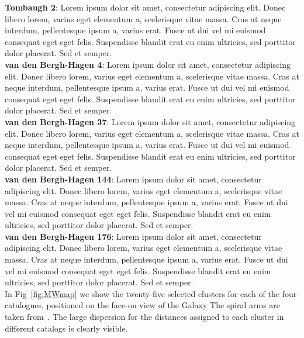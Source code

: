 \documentclass{aa}
\begin{document}
 \noindent\textbf{Tombaugh 2}: Lorem ipsum dolor sit amet, consectetur adipiscing elit. Donec libero lorem, varius eget elementum a, scelerisque vitae massa. Cras at neque interdum, pellentesque ipsum a, varius erat. Fusce ut dui vel mi euismod consequat eget eget felis. Suspendisse blandit erat eu enim ultricies, sed porttitor dolor placerat. Sed et semper.\\

 \noindent\textbf{van den Bergh-Hagen 4}: Lorem ipsum dolor sit amet, consectetur adipiscing elit. Donec libero lorem, varius eget elementum a, scelerisque vitae massa. Cras at neque interdum, pellentesque ipsum a, varius erat. Fusce ut dui vel mi euismod consequat eget eget felis. Suspendisse blandit erat eu enim ultricies, sed porttitor dolor placerat. Sed et semper.\\

 \noindent\textbf{van den Bergh-Hagen 37}: Lorem ipsum dolor sit amet, consectetur adipiscing elit. Donec libero lorem, varius eget elementum a, scelerisque vitae massa. Cras at neque interdum, pellentesque ipsum a, varius erat. Fusce ut dui vel mi euismod consequat eget eget felis. Suspendisse blandit erat eu enim ultricies, sed porttitor dolor placerat. Sed et semper.\\

 \noindent\textbf{van den Bergh-Hagen 144}: Lorem ipsum dolor sit amet, consectetur adipiscing elit. Donec libero lorem, varius eget elementum a, scelerisque vitae massa. Cras at neque interdum, pellentesque ipsum a, varius erat. Fusce ut dui vel mi euismod consequat eget eget felis. Suspendisse blandit erat eu enim ultricies, sed porttitor dolor placerat. Sed et semper.\\

 \noindent\textbf{van den Bergh-Hagen 176}: Lorem ipsum dolor sit amet, consectetur adipiscing elit. Donec libero lorem, varius eget elementum a, scelerisque vitae massa. Cras at neque interdum, pellentesque ipsum a, varius erat. Fusce ut dui vel mi euismod consequat eget eget felis. Suspendisse blandit erat eu enim ultricies, sed porttitor dolor placerat. Sed et semper.\\


 In Fig~\ref{fig:MWmap} we show the twenty-five selected clusters for each of
 the four catalogues, positioned on the face-on view of the Galaxy The spiral
 arms are taken from~\cite{Momany_2006}. The large dispersion for the distances
 assigned to each cluster in different catalogs is clearly visible.
\end{document}
